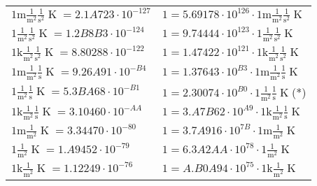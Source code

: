 \begin{center}
\begin{longtable}{l l}
{\color{gray}$1 \bm{\mathrm{ m}}\frac1{\operatorname{m}^2}\frac1{\operatorname{s}^2}{}{\operatorname{K}} = 2.1A723\cdot10^{-127} $}   & {\color{gray}$ 1 = 5.69178\cdot10^{126} \cdot 1 \bm{\mathrm{ m}}\frac1{\operatorname{m}^2}\frac1{\operatorname{s}^2}{}{\operatorname{K}}$}  \\
{\color{black}$1 \bm{\mathrm{ }}\frac1{\operatorname{m}^2}\frac1{\operatorname{s}^2}{}{\operatorname{K}} = 1.2B8B3\cdot10^{-124} $}   & {\color{black}$ 1 = 9.74444\cdot10^{123} \cdot 1 \bm{\mathrm{ }}\frac1{\operatorname{m}^2}\frac1{\operatorname{s}^2}{}{\operatorname{K}}$}  \\
{\color{gray}$1 \bm{\mathrm{ k}}\frac1{\operatorname{m}^2}\frac1{\operatorname{s}^2}{}{\operatorname{K}} = 8.80288\cdot10^{-122} $}   & {\color{gray}$ 1 = 1.47422\cdot10^{121} \cdot 1 \bm{\mathrm{ k}}\frac1{\operatorname{m}^2}\frac1{\operatorname{s}^2}{}{\operatorname{K}}$}  \\
{\color{gray}$1 \bm{\mathrm{ m}}\frac1{\operatorname{m}^2}\frac1{\operatorname{s}}{}{\operatorname{K}} = 9.26A91\cdot10^{-B4} $}   & {\color{gray}$ 1 = 1.37643\cdot10^{B3} \cdot 1 \bm{\mathrm{ m}}\frac1{\operatorname{m}^2}\frac1{\operatorname{s}}{}{\operatorname{K}}$}  \\
{\color{black}$1 \bm{\mathrm{ }}\frac1{\operatorname{m}^2}\frac1{\operatorname{s}}{}{\operatorname{K}} = 5.3BA68\cdot10^{-B1} $}   & {\color{black}$ 1 = 2.30074\cdot10^{B0} \cdot 1 \bm{\mathrm{ }}\frac1{\operatorname{m}^2}\frac1{\operatorname{s}}{}{\operatorname{K}}$}\quad(*)\\
{\color{gray}$1 \bm{\mathrm{ k}}\frac1{\operatorname{m}^2}\frac1{\operatorname{s}}{}{\operatorname{K}} = 3.10460\cdot10^{-AA} $}   & {\color{gray}$ 1 = 3.A7B62\cdot10^{A9} \cdot 1 \bm{\mathrm{ k}}\frac1{\operatorname{m}^2}\frac1{\operatorname{s}}{}{\operatorname{K}}$}  \\
{\color{gray}$1 \bm{\mathrm{ m}}\frac1{\operatorname{m}^2}{}{}{\operatorname{K}} = 3.34470\cdot10^{-80} $}   & {\color{gray}$ 1 = 3.7A916\cdot10^{7B} \cdot 1 \bm{\mathrm{ m}}\frac1{\operatorname{m}^2}{}{}{\operatorname{K}}$}  \\
{\color{black}$1 \bm{\mathrm{ }}\frac1{\operatorname{m}^2}{}{}{\operatorname{K}} = 1.A9452\cdot10^{-79} $}   & {\color{black}$ 1 = 6.3A2AA\cdot10^{78} \cdot 1 \bm{\mathrm{ }}\frac1{\operatorname{m}^2}{}{}{\operatorname{K}}$}  \\
{\color{gray}$1 \bm{\mathrm{ k}}\frac1{\operatorname{m}^2}{}{}{\operatorname{K}} = 1.12249\cdot10^{-76} $}   & {\color{gray}$ 1 = A.B0A94\cdot10^{75} \cdot 1 \bm{\mathrm{ k}}\frac1{\operatorname{m}^2}{}{}{\operatorname{K}}$}  \\

\end{longtable}
\end{center}
